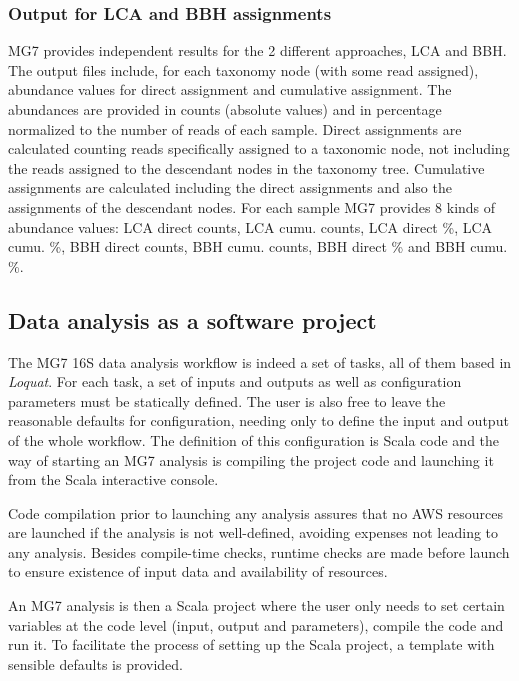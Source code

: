 \documentclass[fleqn,10pt,lineno]{wlpeerj}
\begin{document}
\subsubsection{Output for LCA and BBH
assignments}\label{output-for-lca-and-bbh-assignments}

MG7 provides independent results for the 2 different approaches, LCA and
BBH. The output files include, for each taxonomy node (with some read
assigned), abundance values for direct assignment and cumulative
assignment. The abundances are provided in counts (absolute values) and
in percentage normalized to the number of reads of each sample. Direct
assignments are calculated counting reads specifically assigned to a
taxonomic node, not including the reads assigned to the descendant nodes
in the taxonomy tree. Cumulative assignments are calculated including
the direct assignments and also the assignments of the descendant nodes.
For each sample MG7 provides 8 kinds of abundance values: LCA direct
counts, LCA cumu. counts, LCA direct \%, LCA cumu. \%, BBH direct
counts, BBH cumu. counts, BBH direct \% and BBH cumu. \%.

\subsection{Data analysis as a software
project}\label{data-analysis-as-a-software-project}

The MG7 16S data analysis workflow is indeed a set of tasks, all of them
based in \emph{Loquat}. For each task, a set of inputs and outputs as
well as configuration parameters must be statically defined. The user is
also free to leave the reasonable defaults for configuration, needing
only to define the input and output of the whole workflow. The
definition of this configuration is Scala code and the way of starting
an MG7 analysis is compiling the project code and launching it from the
Scala interactive console.

Code compilation prior to launching any analysis assures that no AWS
resources are launched if the analysis is not well-defined, avoiding
expenses not leading to any analysis. Besides compile-time checks,
runtime checks are made before launch to ensure existence of input data
and availability of resources.

An MG7 analysis is then a Scala project where the user only needs to set
certain variables at the code level (input, output and parameters),
compile the code and run it. To facilitate the process of setting up the
Scala project, a template with sensible defaults is provided.
\end{document}
